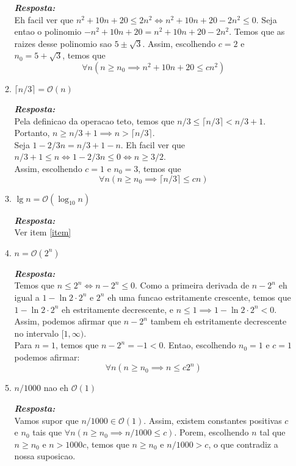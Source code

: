 \documentclass{article}
\begin{document}
\begin{enumerate}[itemsep=3ex, label=\textbf{\arabic*}.]
\begin{enumerate}
        \textit{\textbf{Resposta:}}\\
        Eh facil ver que $n^2 + 10n + 20 \leq 2n^2 \iff n^2 + 10n + 20 - 2n^2 \leq 0$. 
        Seja entao o polinomio $-n^2 + 10n + 20 = n^2 + 10n + 20 - 2n^2$. Temos que as raizes desse polinomio sao $5 \pm \sqrt{3}$. Assim, escolhendo $c = 2$ e $n_0 = 5 + \sqrt{3}$, temos que
        $$
        \forall n (n \geq n_0 \implies n^2 + 10n + 20 \leq c n^2)
        $$
        
        \item
        $\lceil n/3 \rceil = \mathcal{O}(n)$
        
        \textit{\textbf{Resposta:}}\\
        Pela definicao da operacao teto, temos que $n/3 \leq \lceil n/3 \rceil < n/3 + 1$. Portanto, $n \geq n/3 + 1 \implies n > \lceil n/3 \rceil$.\\
        Seja $1 - 2/3 n = n/3 + 1 - n$. Eh facil ver que $n/3 + 1 \leq n \iff 1 - 2/3 n \leq 0 \iff n \geq 3/2$.\\
        Assim, escolhendo $c = 1$ e $n_0 = 3$, temos que
        $$
        \forall n (n \geq n_0 \implies \lceil n/3 \rceil \leq c n)
        $$
        
        \item
        $\lg n = \mathcal{O}(\log_{10} n)$
        
        \textit{\textbf{Resposta:}}\\
        Ver item \ref{item}
        
        \item
        $n = \mathcal{O}(2^n)$
        
        \textit{\textbf{Resposta:}}\\
        Temos que $n \leq 2^n \iff n - 2^n \leq 0$. Como a primeira derivada de $n - 2^n$ eh igual a $1 - \ln 2 \cdot 2^n$ e $2^n$ eh uma funcao estritamente crescente, temos que $1 - \ln 2 \cdot 2^n$ eh estritamente decrescente, e $n \leq 1 \implies 1 - \ln 2 \cdot 2^n < 0$. Assim, podemos afirmar que $n - 2^n$ tambem eh estritamente decrescente no intervalo $[1, \infty)$.\\
        Para $n = 1$, temos que $n - 2^n = -1 < 0$. Entao, escolhendo $n_0 = 1$ e $c = 1$ podemos afirmar:
        $$
        \forall n (n \geq n_0 \implies n \leq c 2^n) 
        $$
        
        \item
        $n/1000$ nao eh $\mathcal{O}(1)$
        
        \textit{\textbf{Resposta:}}\\
        Vamos supor que $n/1000 \in \mathcal{O}(1)$. Assim, existem constantes positivas $c$ e $n_0$ tais que $\forall n (n \geq n_0 \implies n/1000 \leq c)$.
        Porem, escolhendo $n$ tal que $n \geq n_0$ e $n > 1000c$, temos que $n \geq n_0$ e $n/1000 > c$, o que contradiz a nossa suposicao.
        

\end{enumerate}
\end{enumerate}
\end{document}
